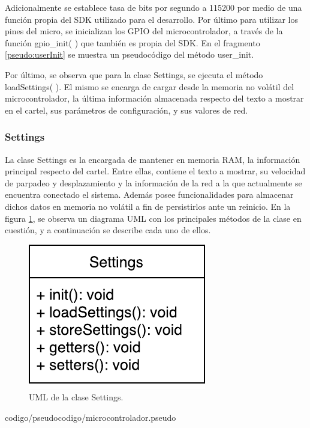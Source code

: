 Adicionalmente se establece tasa de bits por segundo a 115200 por medio de una función propia del SDK utilizado para el desarrollo.
Por último para utilizar los pines del micro, se inicializan los GPIO del microcontrolador, a través de la función gpio\_init( ) que también es propia del SDK.
En el fragmento \ref{pseudo:userInit} se muestra un pseudocódigo del método user\_init\( \).

Por último, se observa que para la clase Settings, se ejecuta el método loadSettings( ).
El mismo se encarga de cargar desde la memoria no volátil del microcontrolador, la última información almacenada respecto del texto a mostrar en el cartel, sus parámetros de configuración, y sus valores de red. \newline

\subsubsection{Settings}

La clase Settings es la encargada de mantener en memoria RAM, la información principal respecto del cartel.
Entre ellas, contiene el texto a mostrar, su velocidad de parpadeo y desplazamiento y la información de la red a la que actualmente se encuentra conectado el sistema.
Además posee funcionalidades para almacenar dichos datos en memoria no volátil a fin de persistirlos ante un reinicio.
En la figura \ref{uml:settings}, se observa un diagrama UML con los principales métodos de la clase en cuestión, y a continuación se describe cada uno de ellos.

\begin{figure}[!ht]
	\centering
	\includegraphics[scale=0.8]{imagenes/uml/settings.pdf}
	\caption{UML de la clase Settings.}
	\label{uml:settings}
\end{figure}

 {codigo/pseudocodigo/microcontrolador.pseudo}

